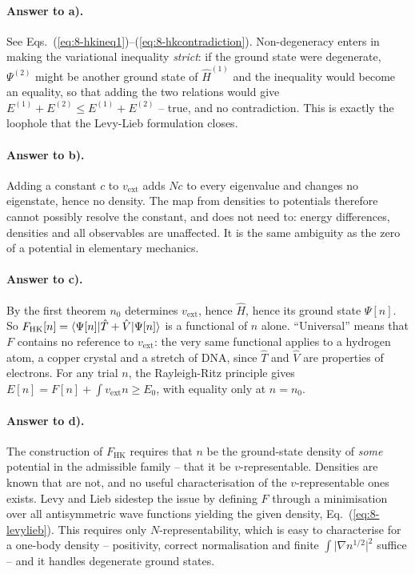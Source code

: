 \paragraph{Answer to a).}
See Eqs.~(\ref{eq:8-hkineq1})--(\ref{eq:8-hkcontradiction}).  Non-degeneracy
enters in making the variational inequality \emph{strict}: if the ground state
were degenerate, $\Psi^{(2)}$ might be another ground state of
$\hat{H}^{(1)}$ and the inequality would become an equality, so that adding
the two relations would give $E^{(1)}+E^{(2)}\le E^{(1)}+E^{(2)}$ -- true, and
no contradiction.  This is exactly the loophole that the Levy-Lieb
formulation closes.

\paragraph{Answer to b).}
Adding a constant $c$ to $v_{\mathrm{ext}}$ adds $Nc$ to every eigenvalue
and changes no eigenstate, hence no density.  The map from densities to
potentials therefore cannot possibly resolve the constant, and does not need
to: energy differences, densities and all observables are unaffected.  It is
the same ambiguity as the zero of a potential in elementary mechanics.

\paragraph{Answer to c).}
By the first theorem $n_0$ determines $v_{\mathrm{ext}}$, hence $\hat{H}$,
hence its ground state $\Psi[n]$.  So
$F_{\mathrm{HK}}[n]=\langle \Psi[n] | \hat{T}+\hat{V} | \Psi[n] \rangle$ is a
functional of $n$ alone.  ``Universal'' means that $F$ contains no reference
to $v_{\mathrm{ext}}$: the very same functional applies to a hydrogen atom, a
copper crystal and a stretch of DNA, since $\hat{T}$ and $\hat{V}$ are
properties of electrons.  For any trial $n$, the Rayleigh-Ritz principle
gives $E[n]=F[n]+\int v_{\mathrm{ext}}n \ge E_0$, with equality only at
$n=n_0$.

\paragraph{Answer to d).}
The construction of $F_{\mathrm{HK}}$ requires that $n$ be the ground-state
density of \emph{some} potential in the admissible family -- that it be
$v$-representable.  Densities are known that are not, and no useful
characterisation of the $v$-representable ones exists.  Levy and Lieb
sidestep the issue by defining $F$ through a minimisation over all
antisymmetric wave functions yielding the given density,
Eq.~(\ref{eq:8-levylieb}).  This requires only $N$-representability, which is
easy to characterise for a one-body density -- positivity, correct
normalisation and finite $\int\vert\nabla n^{1/2}\vert^2$ suffice -- and it
handles degenerate ground states.

